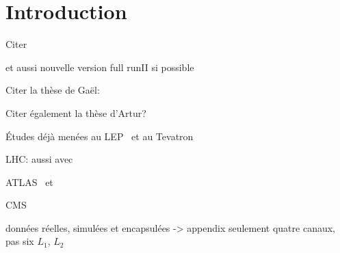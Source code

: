 \section{Introduction}\label{chapter-HTT_analysis-section-introduction}

Citer 

et aussi nouvelle version full runII si possible


Citer la thèse de Gaël:\\

Citer également la thèse d'Artur?\\


Études déjà menées au LEP~\cite{Schael:2006cr} et au Tevatron~\cite{Aaltonen:2009vf,Abazov:2011jh}

LHC: aussi avec \quarkb\antiquarkb~\cite{Chatrchyan:2013qga,Khachatryan:2015tra}

ATLAS \mu\mu\ et \tau\tau~\cite{Aad:2012cfr,ATLAS-MSSM-HTT_2018}

CMS \mu\mu~\cite{CMS:2015ooa} \tau\tau~\cite{Chatrchyan:2012vp,CMS-MSSM-HTT_2014,CMS-PAS-HIG-17-020}


données réelles, simulées et encapsulées  -> appendix
seulement quatre canaux, pas six
$L_1$, $L_2$